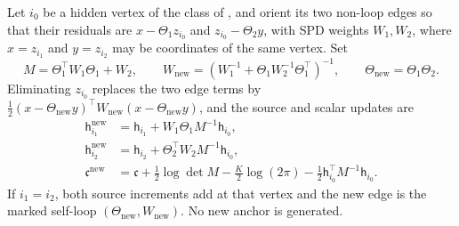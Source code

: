Let \(i_0\) be a hidden vertex of the class of
, and orient its two non-loop edges so that
their residuals are \(x-\Theta_1z_{i_0}\) and \(z_{i_0}-\Theta_2y\), with SPD
weights \(W_1,W_2\), where \(x=z_{i_1}\) and \(y=z_{i_2}\) may be coordinates of
the same vertex. Set
\begin{equation}
M=\Theta_1^\top W_1\Theta_1+W_2,\qquad
W_{\mathrm{new}}=(W_1^{-1}+\Theta_1W_2^{-1}\Theta_1^\top)^{-1},\qquad
\Theta_{\mathrm{new}}=\Theta_1\Theta_2 .
\label{eq:cg-nonflat-series-weight}
\end{equation}
Eliminating \(z_{i_0}\) replaces the two edge terms by
\(\frac12(x-\Theta_{\mathrm{new}}y)^\top W_{\mathrm{new}}(x-\Theta_{\mathrm{new}}y)\),
and the source and scalar updates are
\begin{equation}
\begin{aligned}
\mathsf h_{i_1}^{\mathrm{new}}&=\mathsf h_{i_1}+W_1\Theta_1M^{-1}\mathsf h_{i_0},\\
\mathsf h_{i_2}^{\mathrm{new}}&=\mathsf h_{i_2}+\Theta_2^\top W_2M^{-1}\mathsf h_{i_0},\\
\mathfrak c^{\mathrm{new}}
&=\mathfrak c+\frac12\log\det M-\frac K2\log(2\pi)
                         -\frac12\mathsf h_{i_0}^\top M^{-1}\mathsf h_{i_0}.
\end{aligned}
\label{eq:cg-nonflat-series-source-scalar}
\end{equation}
If \(i_1=i_2\), both source increments add at that vertex and the new edge is
the marked self-loop \((\Theta_{\mathrm{new}},W_{\mathrm{new}})\). No new
anchor is generated. 


